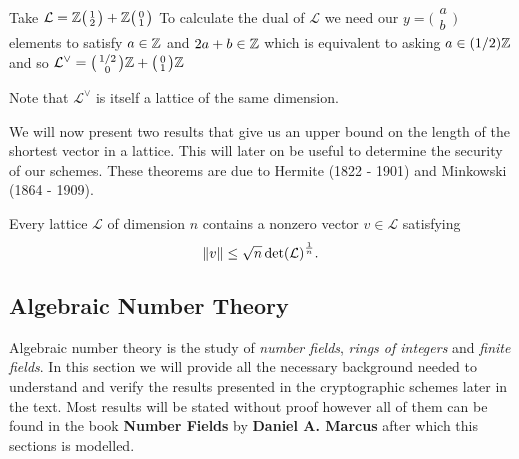 \begin{example}
    Take $\mathcal{L}= \mathbb{Z} 
        \big(\begin{smallmatrix} 1\\2 \end{smallmatrix}\big) + 
        \mathbb{Z} \big(\begin{smallmatrix} 0\\ 1 \end{smallmatrix}\big)$
        To calculate the dual of $\mathcal{L}$ we need our $y = \big(\begin{smallmatrix}
          a\\b\end{smallmatrix}\big)$ elements to satisfy $a \in \mathbb{Z}$ and $2a + b \in \mathbb{Z}$ which is equivalent to asking $a \in (1/2)\mathbb{Z}$ and so $\mathcal{L}^{\vee} = \big(\begin{smallmatrix}
          1/2\\0
        \end{smallmatrix}\big)\mathbb{Z} + \big(\begin{smallmatrix}
          0\\1
        \end{smallmatrix}\big) \mathbb{Z}$
\end{example}

Note that $\mathcal{L}^{\vee}$ is itself a lattice of the same dimension.

We will now present two results that give us an upper bound on the length of the shortest vector in a lattice. This will later on be useful to determine the security of our schemes. These theorems are due to Hermite (1822 - 1901) and Minkowski (1864 - 1909).

\begin{theorem}
    Every lattice $\mathcal{L}$ of dimension $n$ contains a nonzero vector $v \in \mathcal{L}$ satisfying
    $$ \norm{v} \leq \sqrt{n} \det(\mathcal{L})^{\frac{1}{n}}.$$
\end{theorem}

\begin{remark}
    
\end{remark}

\subsection{Algebraic Number Theory}

Algebraic number theory is the study of \textit{number fields}, \textit{rings of integers} and \textit{finite fields}. In this section we will provide all the necessary background needed to understand and verify the results presented in the cryptographic schemes later in the text. Most results will be stated without proof however all of them can be found in the book \textbf{Number Fields} by \textbf{Daniel A. Marcus} \cite{algebra} after which this sections is modelled.

